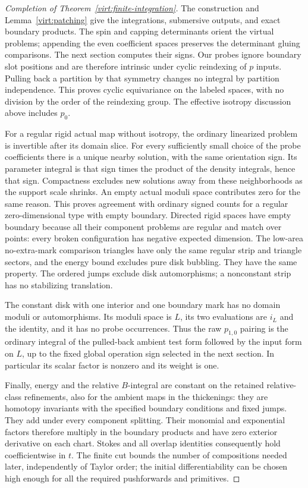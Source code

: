\begin{proof}[Completion of Theorem~\ref{virt:finite-integration}]
The construction and Lemma~\ref{virt:patching} give the integrations,
submersive outputs, and exact boundary products.  The spin and capping
determinants orient the virtual problems; appending the even coefficient
spaces preserves the determinant gluing comparisons.  The next section
computes their signs.  Our probes ignore boundary slot positions and
are therefore intrinsic under cyclic reindexing of $p$ inputs.  Pulling
back a partition by that symmetry changes no integral by partition
independence.  This proves cyclic equivariance on the labeled spaces,
with no division by the order of the reindexing group.  The effective
isotropy discussion above includes $p_0$.

For a regular rigid actual map without isotropy, the ordinary linearized
problem is invertible after its domain slice.  For every sufficiently
small choice of the probe coefficients there is a unique nearby
solution, with the same orientation sign.  Its parameter integral is
that sign times the product of the density integrals, hence that sign.
Compactness excludes new solutions away from these neighborhoods as the
support scale shrinks.  An empty actual moduli space contributes zero
for the same reason.  This proves agreement with ordinary signed counts
for a regular zero-dimensional type with empty boundary.  Directed
rigid spaces have empty boundary because all their component problems
are regular and match over points: every broken configuration has
negative expected dimension.  The low-area no-extra-mark comparison
triangles have only the same regular strip and triangle sectors, and
the energy bound excludes pure disk bubbling.  They have the same
property.  The ordered jumps exclude disk automorphisms; a nonconstant
strip has no stabilizing translation.

The constant disk with one interior and one boundary mark has no domain
moduli or automorphisms.  Its moduli space is $L$, its two evaluations
are $i_L$ and the identity, and it has no probe occurrences.  Thus the
raw $p_{1,0}$ pairing is the ordinary integral of the pulled-back ambient
test form followed by the input form on $L$, up to the fixed global
operation sign selected in the next section.  In particular its scalar
factor is nonzero and its weight is one.

Finally, energy and the relative $B$-integral are constant on the retained
relative-class refinements, also for the ambient maps in the
thickenings: they are homotopy invariants with the specified boundary
conditions and fixed jumps.  They add under every component splitting.
Their monomial and exponential factors therefore multiply in the
boundary products and have zero exterior derivative on each chart.
Stokes and all overlap identities consequently hold coefficientwise in
$t$.  The finite cut bounds the number of compositions needed later,
independently of Taylor order; the initial differentiability can be
chosen high enough for all the required pushforwards and primitives.
\end{proof}
